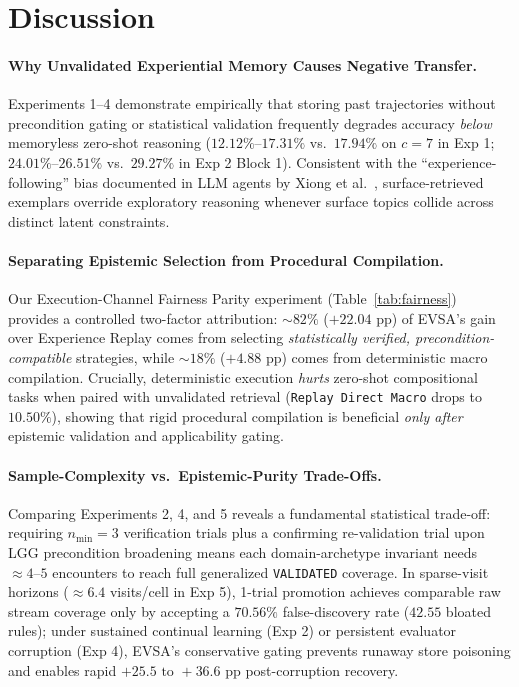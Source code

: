 \documentclass[10pt,letterpaper]{article}
\begin{document}
\section{Discussion}
\paragraph{Why Unvalidated Experiential Memory Causes Negative Transfer.}
Experiments 1--4 demonstrate empirically that storing past trajectories without precondition gating or statistical validation frequently degrades accuracy \emph{below} memoryless zero-shot reasoning ($12.12\%\text{--}17.31\%$ vs.\ $17.94\%$ on $c=7$ in Exp 1; $24.01\%\text{--}26.51\%$ vs.\ $29.27\%$ in Exp 2 Block 1). Consistent with the ``experience-following'' bias documented in LLM agents by Xiong et al.\ \cite{xiong2026memory}, surface-retrieved exemplars override exploratory reasoning whenever surface topics collide across distinct latent constraints.

\paragraph{Separating Epistemic Selection from Procedural Compilation.}
Our Execution-Channel Fairness Parity experiment (Table~\ref{tab:fairness}) provides a controlled two-factor attribution: $\sim 82\%$ ($+22.04\text{ pp}$) of EVSA's gain over Experience Replay comes from selecting \emph{statistically verified, precondition-compatible} strategies, while $\sim 18\%$ ($+4.88\text{ pp}$) comes from deterministic macro compilation. Crucially, deterministic execution \emph{hurts} zero-shot compositional tasks when paired with unvalidated retrieval (\texttt{Replay Direct Macro} drops to $10.50\%$), showing that rigid procedural compilation is beneficial \emph{only after} epistemic validation and applicability gating.

\paragraph{Sample-Complexity vs.\ Epistemic-Purity Trade-Offs.}
Comparing Experiments 2, 4, and 5 reveals a fundamental statistical trade-off: requiring $n_{\min}=3$ verification trials plus a confirming re-validation trial upon LGG precondition broadening means each domain-archetype invariant needs $\approx 4\text{--}5$ encounters to reach full generalized \texttt{VALIDATED} coverage. In sparse-visit horizons ($\approx 6.4$ visits/cell in Exp 5), 1-trial promotion achieves comparable raw stream coverage only by accepting a $70.56\%$ false-discovery rate ($42.55$ bloated rules); under sustained continual learning (Exp 2) or persistent evaluator corruption (Exp 4), EVSA's conservative gating prevents runaway store poisoning and enables rapid $+25.5\text{ to }+36.6\text{ pp}$ post-corruption recovery.
\end{document}
